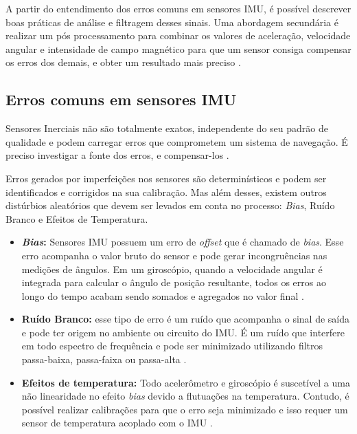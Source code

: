 A partir do entendimento dos erros comuns em sensores IMU, é possível descrever boas práticas de análise e filtragem desses sinais. Uma abordagem secundária é realizar um pós processamento para combinar os valores de aceleração, velocidade angular e intensidade de campo magnético para que um sensor consiga compensar os erros dos demais, e obter um resultado mais preciso \cite{manual:cambimu}.

\subsection{Erros comuns em sensores IMU}

Sensores Inerciais não são totalmente exatos, independente do seu padrão de qualidade e podem carregar erros que comprometem um sistema de navegação. É preciso investigar a fonte dos erros, e compensar-los \cite{diss:FabioAUV}.

Erros gerados por imperfeições nos sensores são determinísticos e podem ser identificados e corrigidos na sua calibração. Mas além desses, existem outros distúrbios aleatórios que devem ser levados em conta no processo: \textit{Bias}, Ruído Branco e Efeitos de Temperatura.

\begin{itemize}
	\item \textbf{\textit{Bias}:} Sensores IMU possuem um erro de \textit{offset} que é chamado de \textit{bias}. Esse erro acompanha o valor bruto do sensor e pode gerar incongruências nas medições de ângulos. Em um giroscópio, quando a velocidade angular é integrada para calcular o ângulo de posição resultante, todos os erros ao longo do tempo acabam sendo somados e agregados no valor final \cite{manual:cambimu}. 
	
	\item \textbf{Ruído Branco:} esse tipo de erro é um ruído que acompanha o sinal de saída e pode ter origem no ambiente ou circuito do IMU. É um ruído que interfere em todo  espectro de frequência e pode ser minimizado utilizando filtros passa-baixa, passa-faixa ou passa-alta \cite{diss:FabioAUV}.
	
	\item \textbf{Efeitos de temperatura:} Todo acelerômetro e giroscópio é suscetível a uma não linearidade no efeito \textit{bias} devido a flutuações na temperatura. Contudo, é possível realizar calibrações para que o erro seja minimizado e isso requer um sensor de temperatura acoplado com o IMU \cite{manual:cambimu}. 
\end{itemize}

